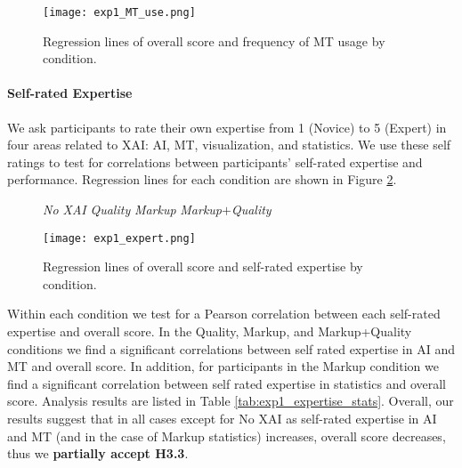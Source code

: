 \begin{figure}[h!]
    \centering
    \texttt{[image: exp1\_MT\_use.png]}
    \caption{Regression lines of overall score and frequency of MT usage by condition.}
    \label{fig:exp1_MT_use}
\end{figure}

\paragraph{Self-rated Expertise}

We ask participants to rate their own expertise from 1 (Novice) to 5 (Expert) in four areas related to XAI: AI, MT, visualization, and statistics. We use these self ratings to test for correlations between participants’ self-rated expertise and performance. Regression lines for each condition are shown in Figure \ref{fig:exp1_expert}. 

\begin{figure}[h!]
    \centering
    
     \textit{No XAI} \quad
     \textit{Quality} \quad
     \textit{Markup} \quad
     \textit{Markup$+$Quality}
    
    \texttt{[image: exp1\_expert.png]}
    \caption{Regression lines of overall score and self-rated expertise by condition.}
    \label{fig:exp1_expert}
\end{figure}

Within each condition we test for a Pearson correlation between each self-rated expertise and overall score. In the Quality, Markup, and Markup+Quality conditions we find a significant correlations between self rated expertise in AI and MT and overall score. In addition, for participants in the Markup condition we find a significant correlation between self rated expertise in statistics and overall score. Analysis results are listed in Table \ref{tab:exp1_expertise_stats}. Overall, our results suggest that in all cases except for No XAI as self-rated expertise in AI and MT (and in the case of Markup statistics) increases, overall score decreases, thus we \textbf{partially accept H3.3}.

